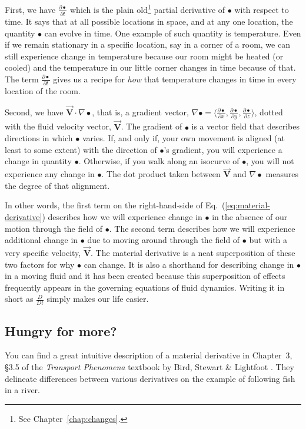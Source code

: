 First, we have $\frac{\partial \bullet}{\partial t}$ which is the plain old\footnote{See Chapter~\ref{chap:changes}.} partial derivative of $\bullet$ with respect to time. It says that at all possible locations in space, and at any one location, the quantity $\bullet$ can evolve in time. One example of such quantity is temperature. Even if we remain stationary in a specific location, say in a corner of a room, we can still experience change in temperature because our room might be heated (or cooled) and the temperature in our little corner changes in time because of that. The term $\frac{\partial \bullet}{\partial t}$ gives us a recipe for \textit{how} that temperature changes in time in every location of the room.

Second, we have $\vec{\bm{V}} \cdot \nabla \bullet$, that is, a gradient vector, $\nabla \bullet = \langle \frac{\partial \bullet}{\partial x}, \frac{\partial \bullet}{\partial y}, \frac{\partial \bullet}{\partial z} \rangle$, dotted with the fluid velocity vector, $\vec{\bm{V}}$. 
The gradient of $\bullet$ is a vector field that describes directions in which $\bullet$ varies. If, and only if, your own movement is aligned (at least to some extent) with the direction of $\bullet$'s gradient, you will experience a change in quantity $\bullet$. Otherwise, if you walk along an isocurve of $\bullet$, you will not experience any change in $\bullet$. The dot product taken between $\vec{\bm{V}}$ and $\nabla \bullet$ measures the degree of that alignment.

In other words, the first term on the right-hand-side of Eq.~(\ref{eq:material-derivative}) describes how we will experience change in $\bullet$ in the absence of our motion through the field of $\bullet$. The second term describes how we will experience additional change in $\bullet$ due to moving around through the field of $\bullet$ but with a very specific velocity, $\vec{\bm{V}}$. The material derivative is a neat superposition of these two factors for why $\bullet$ can change. It is also a shorthand for describing change in $\bullet$ in a moving fluid and it has been created because this superposition of effects frequently appears in the governing equations of fluid dynamics. Writing it in short as $\frac{D}{D t}$ simply makes our life easier.

\begin{mdframed}[style=exercise-frame]

\subsection*{Hungry for more?}

You can find a great intuitive description of a material derivative in Chapter~3, \S3.5 of the \textit{Transport Phenomena} textbook by Bird, Stewart \& Lightfoot \cite{bird2002transport}. They delineate differences between various derivatives on the example of following fish in a river.

\end{mdframed}

